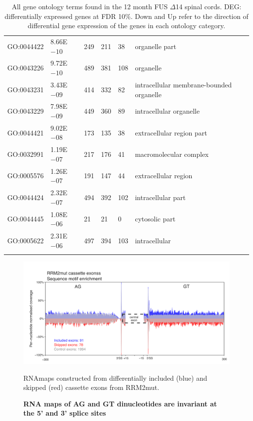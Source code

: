 \begin{appendices}
\begin{longtable}{| p{} | p{} |p{} | p{} |p{} | p{} |}
		GO:0044422 & 8.66E$-10$ & 249 & 211 & 38 & organelle part \\ 
		GO:0043226 & 9.72E$-10$ & 489 & 381 & 108 & organelle \\ 
		GO:0043231 & 3.43E$-09$ & 414 & 332 & 82 & intracellular membrane-bounded organelle \\ 
		GO:0043229 & 7.98E$-09$ & 449 & 360 & 89 & intracellular organelle \\ 
		GO:0044421 & 9.02E$-08$ & 173 & 135 & 38 & extracellular region part \\ 
		GO:0032991 & 1.19E$-07$ & 217 & 176 & 41 & macromolecular complex \\ 
		GO:0005576 & 1.26E$-07$ & 191 & 147 & 44 & extracellular region \\ 
		GO:0044424 & 2.32E$-07$ & 494 & 392 & 102 & intracellular part \\ 
		GO:0044445 & 1.08E$-06$ & 21 & 21 & 0 & cytosolic part \\ 
		GO:0005622 & 2.31E$-06$ & 497 & 394 & 103 & intracellular \\ 
		\hline 
	\caption{All gene ontology terms found in the 12 month FUS $\Delta$14 spinal cords. DEG: differentially expressed genes at FDR 10\%. Down and Up refer to the direction of differential gene expression of the genes in each ontology category.} 
	\label{append:d14_spinal_go} 
\end{longtable} 

\clearpage





\begin{figure}
	\centering
	\includegraphics[width=14cm]{Figures/05_tdp_mice/RNAmap_motif_AG_GT_RRM2mut.png}
	\caption{\textbf{RNA maps of AG and GT dinucleotides are invariant at the 5' and 3' splice sites}}
	RNAmaps constructed from differentially included (blue) and skipped (red) cassette exons from RRM2mut.
	

\end{figure}
\end{appendices}
